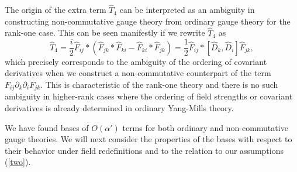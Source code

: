 \documentclass[a4paper,12pt]{article}
\begin{document}
The origin of the extra term $\hat{T}_4$ can be interpreted
as an ambiguity in constructing non-commutative gauge theory from
ordinary gauge theory for the rank-one case.
This can be seen manifestly if we rewrite $\hat{T}_4$ as
\begin{equation}
\hat{T}_4 = \frac{i}{2} \hat{F}_{ij} \ast
(\hat{F}_{jk} \ast \hat{F}_{ki} - \hat{F}_{ki} \ast \hat{F}_{jk})
= \frac{1}{2} \hat{F}_{ij} \ast [ \hat{D}_k, \hat{D}_i] \hat{F}_{jk},
\end{equation}
which precisely corresponds to the ambiguity of the ordering
of covariant derivatives when we construct
a non-commutative counterpart of the term
$F_{ij} \partial_k \partial_i F_{jk}$.
This is characteristic of the rank-one theory and
there is no such ambiguity in higher-rank cases
where the ordering of field strengths or covariant derivatives
is already determined in ordinary Yang-Mills theory.

We have found bases of $O(\alpha')$ terms
for both ordinary and non-commutative gauge theories.
We will next consider the properties of the bases
with respect to their behavior under field redefinitions
and to the relation to our assumptions (\ref{two}).
\end{document}
